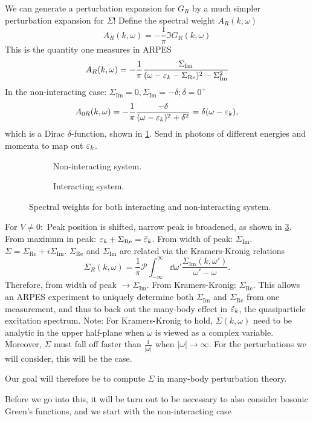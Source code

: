 We can generate a perturbation expansion for $G_R$ by a much simpler perturbation expansion for $\Sigma$!
Define the spectral weight $A_R(k,\omega)$
\begin{equation} 
\label{eq:spectral_function}
A_R(k,\omega) = -\frac{1}{\pi}\Im{G_R(k,\omega)}
\end{equation}
This is the quantity one measures in ARPES 
\begin{equation} 
A_R(k,\omega) = -\frac{1}{\pi}\frac{\Sigma_{\text{Im}}}{(\omega -\varepsilon_k -\Sigma_{\text{Re}})^2-\Sigma_{\text{Im}}^2}
\end{equation}
In the non-interacting case:
$\Sigma_{\text{Im}} = 0, \Sigma_{\text{Im}} = -\delta; \delta = 0^+$
\begin{equation} 
A_{0R}(k, \omega) = -\frac{1}{\pi}\frac{-\delta}{(\omega-\varepsilon_k)^2 + \delta^2} = \delta(\omega -\varepsilon_k),
\end{equation}
which is a Dirac $\delta$-function, shown in \cref{fig:dirac_delta}. Send in photons of different energies and momenta to map out $\varepsilon_k$. 
\begin{figure}
	\begin{subfigure}{0.5\linewidth}
	\centering
	
	\caption{Non-interacting system.}
	\label{fig:dirac_delta}
	\end{subfigure}
	\begin{subfigure}{0.5\linewidth}
	\centering
	
	\caption{Interacting system.}
	\label{fig:lorentzian}
	\end{subfigure}
	\caption{Spectral weights for both interacting and non-interacting system.}
\end{figure}
For $V\ne 0:$ Peak position is shifted, narrow peak is broadened, as shown in \cref{fig:lorentzian}.
From maximum in peak: $\varepsilon_k + \Sigma_{\text{Re}} = \tilde{\varepsilon}_k$. From width of peak: $\Sigma_{\text{Im}}$.
$\Sigma = \Sigma_{\text{Re}} + i\Sigma_{\text{Im}}$. $\Sigma_{\text{Re}}$ and $\Sigma_{\text{Im}}$ are related via the Kramers-Kronig relations
\begin{equation} 
\Sigma_R(k,\omega) = \frac{1}{\pi}\mathcal{P}\int_{-\infty}^\infty\dd{\omega'}\frac{\Sigma_{\text{Im}}(k,\omega')}{\omega'-\omega}.
\end{equation}
Therefore, from width of peak $\rightarrow \Sigma_{\text{Im}}$. From Kramers-Kronig: $\Sigma_{\text{Re}}$. This allows an ARPES experiment to uniquely determine both $\Sigma_{\text{Im}}$ and $\Sigma_{\text{Re}}$ from one measurement, and thus to back out the many-body effect in  $\tilde{\varepsilon}_k$, the quasiparticle excitation spectrum. Note: For Kramers-Kronig to hold, $\Sigma(k,\omega)$ need to be analytic in the upper half-plane when $\omega$ is viewed as a complex variable. Moreover, $\Sigma$ must fall off faster than $\frac{1}{|\omega|}$ when $|\omega| \rightarrow \infty.$ For the perturbations we will consider, this will be the case. 
\begin{tcolorbox}
	Our goal will therefore be to compute $\Sigma$ in many-body perturbation theory.
\end{tcolorbox}
Before we go into this, it will be turn out to be necessary to also consider bosonic Green's functions, and we start with the non-interacting case
